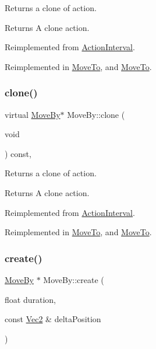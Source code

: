 Returns a clone of action.

\begin{DoxyReturn}{Returns}
A clone action. 
\end{DoxyReturn}


Reimplemented from \hyperlink{classActionInterval_abc93ce0c2f54a90eb216a7803f25f44a}{Action\+Interval}.



Reimplemented in \hyperlink{classMoveTo_a9e164c0f1ef2a22a61377120e5463e60}{Move\+To}, and \hyperlink{classMoveTo_a0b5517ba663ab08cd69a51ba72b8e14c}{Move\+To}.

\mbox{\label{classMoveBy_a61bec7fdd7e48d0388627f1e348ab450}} 
\subsubsection{\texorpdfstring{clone()}{clone()}\hspace{0.1cm}{\footnotesize\ttfamily [2/2]}}
{\footnotesize\ttfamily virtual \hyperlink{classMoveBy}{Move\+By}$\ast$ Move\+By\+::clone (\begin{DoxyParamCaption}\item[{void}]{ }\end{DoxyParamCaption}) const\hspace{0.3cm}{\ttfamily [override]}, {\ttfamily [virtual]}}

Returns a clone of action.

\begin{DoxyReturn}{Returns}
A clone action. 
\end{DoxyReturn}


Reimplemented from \hyperlink{classActionInterval_abc93ce0c2f54a90eb216a7803f25f44a}{Action\+Interval}.



Reimplemented in \hyperlink{classMoveTo_a9e164c0f1ef2a22a61377120e5463e60}{Move\+To}, and \hyperlink{classMoveTo_a0b5517ba663ab08cd69a51ba72b8e14c}{Move\+To}.

\mbox{\label{classMoveBy_a4781fe85da740426582c34276557be5c}} 
\subsubsection{\texorpdfstring{create()}{create()}\hspace{0.1cm}{\footnotesize\ttfamily [1/4]}}
{\footnotesize\ttfamily \hyperlink{classMoveBy}{Move\+By} $\ast$ Move\+By\+::create (\begin{DoxyParamCaption}\item[{float}]{duration,  }\item[{const \hyperlink{classVec2}{Vec2} \&}]{delta\+Position }\end{DoxyParamCaption})\hspace{0.3cm}{\ttfamily [static]}}

